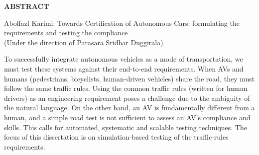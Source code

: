 
\begin{center}
\vspace*{52pt}
{\textbf{ABSTRACT}}
\vspace{11pt}

\begin{singlespace}
    Abolfazl Karimi: Towards Certification of Autonomous Cars: formulating the requirements and testing the compliance\\
(Under the direction of Parasara Sridhar Duggirala)
\end{singlespace}
\end{center}




To successfully integrate autonomous vehicles as a mode of transportation, we must test these systems against their end-to-end requirements.
%
When AVs and humans (pedestrians, bicyclists, human-driven vehicles) share the road, they must follow the same traffic rules.
%
Using the common traffic rules (written for human drivers) as an engineering requirement poses a challenge due to the ambiguity of the natural language.
%
On the other hand, an AV is fundamentally different from a human, and a simple road test is not sufficient to assess an AV's compliance and skills.
%
This calls for automated, systematic and scalable testing techniques.
%
The focus of this dissertation is on simulation-based testing of the traffic-rules requirements.



